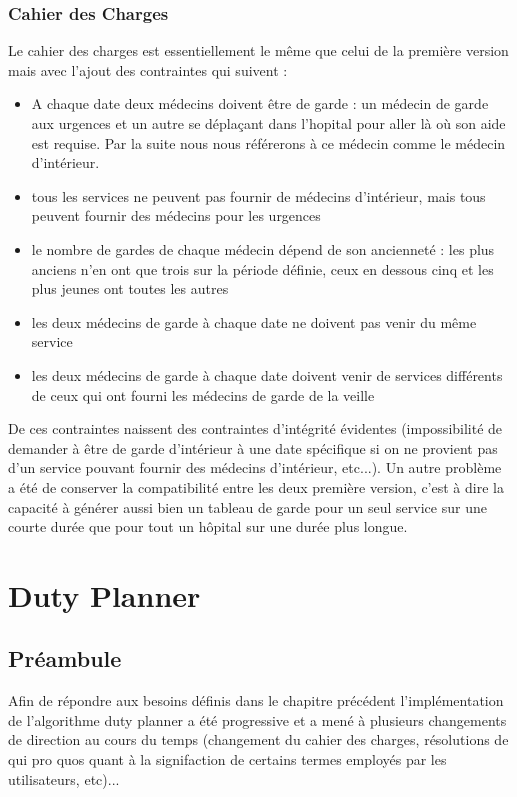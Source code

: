 \documentclass[11pt]{report}
\begin{document}
\subsection{Cahier des Charges}
Le cahier des charges est essentiellement le même que celui de la première version mais avec l'ajout des contraintes qui suivent : 
\begin{itemize}
\item A chaque date deux médecins doivent être de garde : un médecin de garde aux urgences et un autre se déplaçant dans l'hopital pour aller là où son aide est requise.
Par la suite nous nous référerons à ce médecin comme le médecin d'intérieur.
\item tous les services ne peuvent pas fournir de médecins d'intérieur, mais tous peuvent fournir des médecins pour les urgences
\item le nombre de gardes de chaque médecin dépend de son ancienneté : les plus anciens n'en ont que trois sur la période définie, ceux en dessous cinq et les plus jeunes ont toutes les autres
\item les deux médecins de garde à chaque date ne doivent pas venir du même service
\item les deux médecins de garde à chaque date doivent venir de services différents de ceux qui ont fourni les médecins de garde de la veille
\end{itemize}

De ces contraintes naissent des contraintes d'intégrité évidentes (impossibilité de demander à être de garde d'intérieur à une date spécifique si on ne provient pas d'un service pouvant fournir des médecins d'intérieur, etc...).
Un autre problème a été de conserver la compatibilité entre les deux première version, c'est à dire la capacité à générer aussi bien un tableau de garde pour un seul service sur une courte durée que pour tout un hôpital sur une durée plus longue.

\chapter{Duty Planner}
\section{Préambule}
	Afin de répondre aux besoins définis dans le chapitre précédent l'implémentation de l'algorithme duty planner a été progressive et a mené à plusieurs changements de direction au cours du temps (changement du cahier des charges, résolutions de qui pro quos quant à la signifaction de certains termes employés par les utilisateurs, etc)...
\end{document}
